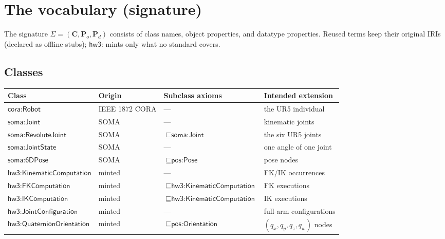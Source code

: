\documentclass[11pt,a4paper]{article}
\newcommand{\IRI}[1]{\textsf{#1}}                    %
\begin{document}
\section{The vocabulary (signature)}\label{sec:vocab}

The signature $\Sigma = (\mathbf{C}, \mathbf{P}_o, \mathbf{P}_d)$ consists of
class names, object properties, and datatype properties. Reused terms keep their
original IRIs (declared as offline stubs); $\IRI{hw3{:}}$ mints only what no
standard covers.

\subsection{Classes}

\begin{center}\scriptsize
\begin{tabular}{@{}llll@{}}
\toprule
Class & Origin & Subclass axioms & Intended extension \\
\midrule
$\IRI{cora{:}Robot}$          & IEEE 1872 CORA & --- & the UR5 individual \\
$\IRI{soma{:}Joint}$          & SOMA & --- & kinematic joints \\
$\IRI{soma{:}RevoluteJoint}$  & SOMA & $\sqsubseteq \IRI{soma{:}Joint}$ & the six UR5 joints \\
$\IRI{soma{:}JointState}$     & SOMA & --- & one angle of one joint \\
$\IRI{soma{:}6DPose}$         & SOMA & $\sqsubseteq \IRI{pos{:}Pose}$ & pose nodes \\
$\IRI{hw3{:}KinematicComputation}$ & minted & --- & FK/IK occurrences \\
$\IRI{hw3{:}FKComputation}$   & minted & $\sqsubseteq \IRI{hw3{:}KinematicComputation}$ & FK executions \\
$\IRI{hw3{:}IKComputation}$   & minted & $\sqsubseteq \IRI{hw3{:}KinematicComputation}$ & IK executions \\
$\IRI{hw3{:}JointConfiguration}$ & minted & --- & full-arm configurations \\
$\IRI{hw3{:}QuaternionOrientation}$ & minted & $\sqsubseteq \IRI{pos{:}Orientation}$ & $(q_x,q_y,q_z,q_w)$ nodes \\
\bottomrule
\end{tabular}
\end{center}
\end{document}
